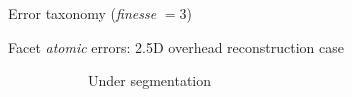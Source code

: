 \documentclass[export]{beamer}
\begin{document}
        \begin{frame}{Error taxonomy (\textit{finesse} $= 3$)}
            \begin{figure}
                
            \end{figure}
        \end{frame}
        \begin{frame}{Facet \textit{atomic} errors: 2.5D overhead reconstruction case}
            \begin{figure}
                \begin{center}
                    \begin{subfigure}{.28\textwidth}
                        \caption{\label{fig::fac_under} Under segmentation}
                    \end{subfigure}
                    \hspace{10pt}
                    \begin{subfigure}{.28\textwidth}

\end{subfigure}
\end{center}
\end{figure}
\end{frame}
\end{document}
